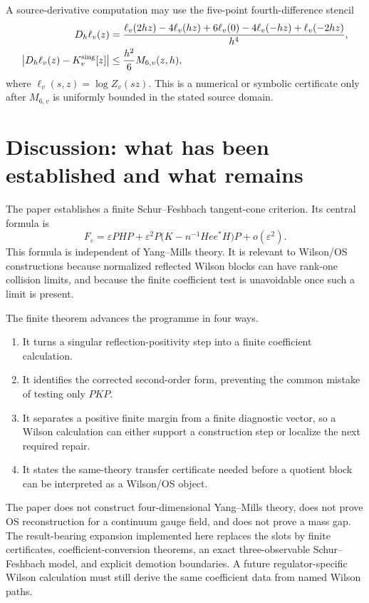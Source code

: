 \documentclass[11pt]{article}
\newcommand{\eps}{\varepsilon}
\begin{document}
A source-derivative computation may use the five-point fourth-difference stencil
\begin{align}
D_h\ell_v(z)
&=\frac{\ell_v(2hz)-4\ell_v(hz)+6\ell_v(0)-4\ell_v(-hz)+\ell_v(-2hz)}{h^4},\notag\\
\left|D_h\ell_v(z)-K_v^{\mathrm{sing}}[z]\right|
&\le\frac{h^2}{6}M_{6,v}(z,h),
\label{eq:central-difference}
\end{align}
where \(\ell_v(s,z)=\log Z_v(sz)\).  This is a numerical or symbolic certificate only after \(M_{6,v}\) is uniformly bounded in the stated source domain.

\section{Discussion: what has been established and what remains}

The paper establishes a finite Schur--Feshbach tangent-cone criterion.  Its central formula is
\[
  F_\eps=
  \eps PHP+
  \eps^2P\bigl(K-n^{-1}Hee^*H\bigr)P+o(\eps^2).
\]
This formula is independent of Yang--Mills theory.  It is relevant to Wilson/OS constructions because normalized reflected Wilson blocks can have rank-one collision limits, and because the finite coefficient test is unavoidable once such a limit is present.

The finite theorem advances the programme in four ways.
\begin{enumerate}[label=(A\arabic*)]
  \item It turns a singular reflection-positivity step into a finite coefficient calculation.
  \item It identifies the corrected second-order form, preventing the common mistake of testing only \(PKP\).
  \item It separates a positive finite margin from a finite diagnostic vector, so a Wilson calculation can either support a construction step or localize the next required repair.
  \item It states the same-theory transfer certificate needed before a quotient block can be interpreted as a Wilson/OS object.
\end{enumerate}

The paper does not construct four-dimensional Yang--Mills theory, does not prove OS reconstruction for a continuum gauge field, and does not prove a mass gap.  The result-bearing expansion implemented here replaces the slots by finite certificates, coefficient-conversion theorems, an exact three-observable Schur--Feshbach model, and explicit demotion boundaries.  A future regulator-specific Wilson calculation must still derive the same coefficient data from named Wilson paths.
\end{document}
